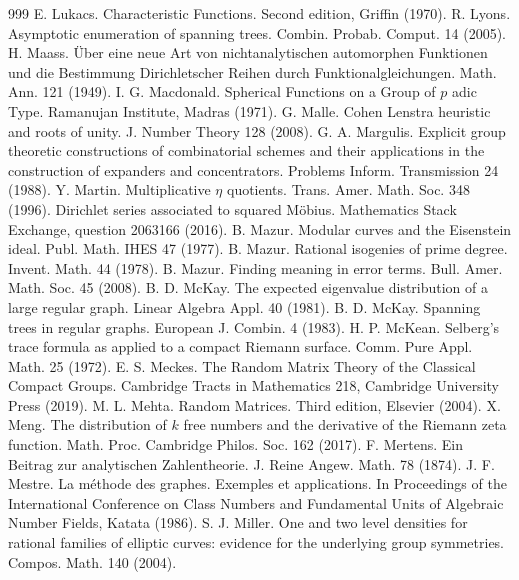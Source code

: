 \begin{thebibliography}{999}
 E. Lukacs. Characteristic Functions. Second edition, Griffin (1970).
 R. Lyons. Asymptotic enumeration of spanning trees. Combin. Probab. Comput. 14 (2005).
 H. Maass. \"Uber eine neue Art von nichtanalytischen automorphen Funktionen und die Bestimmung Dirichletscher Reihen durch Funktionalgleichungen. Math. Ann. 121 (1949).
 I. G. Macdonald. Spherical Functions on a Group of $p$ adic Type. Ramanujan Institute, Madras (1971).
 G. Malle. Cohen Lenstra heuristic and roots of unity. J. Number Theory 128 (2008).
 G. A. Margulis. Explicit group theoretic constructions of combinatorial schemes and their applications in the construction of expanders and concentrators. Problems Inform. Transmission 24 (1988).
 Y. Martin. Multiplicative $\eta$ quotients. Trans. Amer. Math. Soc. 348 (1996).
 Dirichlet series associated to squared M\"obius. Mathematics Stack Exchange, question 2063166 (2016).
 B. Mazur. Modular curves and the Eisenstein ideal. Publ. Math. IHES 47 (1977).
 B. Mazur. Rational isogenies of prime degree. Invent. Math. 44 (1978).
 B. Mazur. Finding meaning in error terms. Bull. Amer. Math. Soc. 45 (2008).
 B. D. McKay. The expected eigenvalue distribution of a large regular graph. Linear Algebra Appl. 40 (1981).
 B. D. McKay. Spanning trees in regular graphs. European J. Combin. 4 (1983).
 H. P. McKean. Selberg's trace formula as applied to a compact Riemann surface. Comm. Pure Appl. Math. 25 (1972).
 E. S. Meckes. The Random Matrix Theory of the Classical Compact Groups. Cambridge Tracts in Mathematics 218, Cambridge University Press (2019).
 M. L. Mehta. Random Matrices. Third edition, Elsevier (2004).
 X. Meng. The distribution of $k$ free numbers and the derivative of the Riemann zeta function. Math. Proc. Cambridge Philos. Soc. 162 (2017).
 F. Mertens. Ein Beitrag zur analytischen Zahlentheorie. J. Reine Angew. Math. 78 (1874).
 J. F. Mestre. La m\'ethode des graphes. Exemples et applications. In Proceedings of the International Conference on Class Numbers and Fundamental Units of Algebraic Number Fields, Katata (1986).
 S. J. Miller. One and two level densities for rational families of elliptic curves: evidence for the underlying group symmetries. Compos. Math. 140 (2004).

\end{thebibliography}
